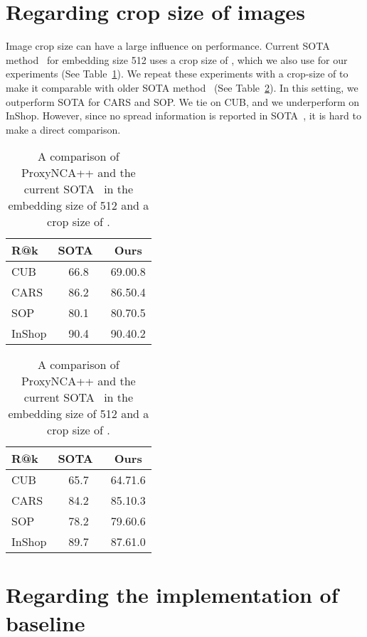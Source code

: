 \documentclass[runningheads]{llncs}
\begin{document}
\section{Regarding crop size of images}

Image crop size can have a large influence on performance. Current SOTA method~\cite{jacob2019metric} for embedding size 512 uses a crop size of , which we also use for our experiments (See Table~\ref{table:256}). We repeat these experiments with a crop-size of  to make it comparable with older SOTA method~\cite{wang2019multi} (See Table~\ref{table:227}). In this setting, we outperform SOTA for CARS and SOP. We tie on CUB, and we underperform on InShop. However, since no spread information is reported in SOTA~\cite{wang2019multi}, it is hard to make a direct comparison.

\begin{table}[H]
\centering
\caption{A comparison of ProxyNCA++ and the current SOTA~\cite{jacob2019metric} in the embedding size of 512 and a crop size of .}
\setlength{\tabcolsep}{3pt}
\begin{tabular}{|l|*2c|}
\hline
R@k & SOTA~\cite{jacob2019metric} & Ours \\
\hline
\small{CUB} & 66.8 & 69.00.8\\
\small{CARS} & 86.2 & 86.50.4\\
\small{SOP} & 80.1 & 80.70.5\\
\small{InShop} & 90.4 & 90.40.2\\
\hline
\end{tabular}
\label{table:256}
\end{table}

\begin{table}[H]
\centering
\caption{A comparison of ProxyNCA++ and the current SOTA~\cite{wang2019multi} in the embedding size of 512 and a crop size of .}
\setlength{\tabcolsep}{3pt}
\begin{tabular}{|l|*2c|}
\hline
R@k & SOTA~\cite{wang2019multi} & Ours \\
\hline
\small{CUB} & 65.7 & 64.71.6\\
\small{CARS} & 84.2 & 85.10.3\\
\small{SOP} & 78.2 & 79.60.6\\
\small{InShop} & 89.7 & 87.61.0\\
\hline
\end{tabular}
\label{table:227}
\end{table}

\section{Regarding the implementation of baseline}
\end{document}
